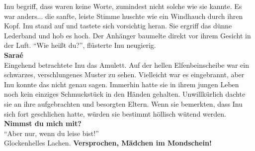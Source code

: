 Inu begriff, dass waren keine Worte, zumindest nicht solche wie sie kannte. Es war anders... die 
sanfte, leiste Stimme huschte wie ein Windhauch durch ihren Kopf. Inu stand auf und tastete sich 
vorsichtig heran.  Sie ergriff das dünne Lederband und hob es hoch. Der Anhänger baumelte direkt 
vor ihrem Gesicht in der Luft. ``Wie heißt du?'', flüsterte Inu neugierig.\\
\textbf{Saraé}\\
Eingehend betrachtete Inu das Amulett. Auf der hellen Elfenbeinscheibe war ein schwarzes, 
verschlungenes Muster zu sehen. Vielleicht war es eingebrannt, aber Inu konnte das nicht genau 
sagen. Immerhin hatte sie in ihrem jungen Leben noch kein einziges Schmuckstück in den Händen 
gehalten. Unwillkürlich dachte sie an ihre aufgebrachten und besorgten Eltern. Wenn sie bemerkten, 
dass Inu sich fort geschlichen hatte, würden sie bestimmt höllisch wütend werden.\\
\textbf{Nimmst du mich mit?}\\
``Aber nur, wenn du leise bist!''\\
Glockenhelles Lachen. \textbf{Versprochen, Mädchen im Mondschein!}\\


